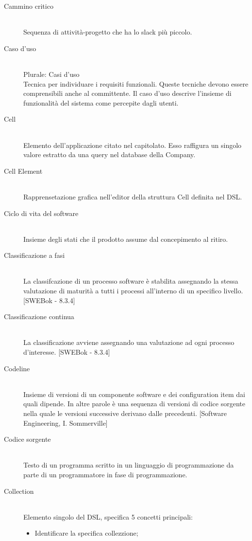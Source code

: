 \begin{description}\item[Cammino critico] \hfill \\
Sequenza di attività-progetto che ha lo slack più piccolo.
 \item[Caso d'uso] \hfill \\
Plurale: Casi d'uso\\ 
Tecnica per individuare i requisiti funzionali. Queste tecniche devono essere comprensibili anche al committente. Il caso d'uso descrive l'insieme di funzionalità del sistema come percepite dagli utenti.
 \item[Cell] \hfill \\
Elemento dell'applicazione citato nel capitolato. Esso
		raffigura un singolo valore estratto da una query nel database della Company.
 \item[Cell Element] \hfill \\
Rapprensetazione grafica nell'editor della struttura Cell definita nel DSL.
 \item[Ciclo di vita del software] \hfill \\
Insieme degli stati che il prodotto assume dal concepimento al ritiro.
 \item[Classificazione a fasi] \hfill \\
La classifcazione di un processo software è stabilita
		assegnando la stessa valutazione di maturità a tutti i processi all'interno di un specifico livello. [SWEBok - 8.3.4]
 \item[Classificazione continua] \hfill \\
La classificazione avviene assegnando una valutazione ad ogni processo d'interesse. [SWEBok - 8.3.4]
 \item[Codeline] \hfill \\
Insieme di versioni di un componente software e dei
		configuration item dai quali dipende. In altre parole è una sequenza di	versioni di codice sorgente nella quale le versioni successive derivano	dalle precedenti. [Software Engineering, I. Sommerville]
 \item[Codice sorgente] \hfill \\
Testo di un programma scritto in un linguaggio di programmazione da parte di un programmatore in fase di programmazione.
 \item[Collection] \hfill \\
Elemento singolo del DSL, specifica 5 concetti principali:
\begin{itemize}
\item Identificare la specifica collezzione;

\end{itemize}
\end{description}
